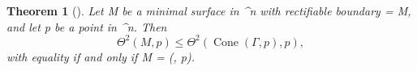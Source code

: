 \documentclass[a4paper, 11pt]{article}
\theoremstyle{plain}
\newtheorem{theorem}{Theorem}[section]
\theoremstyle{definition}
\theoremstyle{remark}
\numberwithin{equation}{subsection}
\def\({}
\def\){}
\def\pi{}
\begin{document}
\begin{theorem}[{\cite[Theorem 1.3]{EWW02}}]
\label{Interior_regularity_basic_estimate}
Let \(M\) be a minimal surface in \(^{n}\) with rectifiable boundary \(\Gamma = \partial M\), and let \(p\) be a point in \(^{n}\). Then
\begin{equation}
\Theta^{2}(M,p) \leqslant \Theta^{2}(\operatorname{Cone}(\Gamma, p), p),
\end{equation}
with equality if and only if \(M = (\Gamma, p)\).
\end{theorem}

\begin{comment}
\begin{proof}
Since \(\Gamma\) is rectifiable, we can assume that \(\operatorname{Length}(\Pi_{p}(\Gamma)) < \infty\) or, equivalently, that \(\Theta^{2}(\operatorname{Cone}(\Gamma, p), p) < \infty\). 

We first consider the case \(p \notin \Gamma\). In the notation above, we can deduce that
\begin{equation}
\Theta^{2}(M', p, r) \leqslant \Theta^{2}(M', p, R)
\end{equation}
for \(0 < r < R < \infty\). For \(R \leqslant \operatorname{dist}(p, \Gamma)\), this is the standard monotonicity formula. For general \(R\), this follows from the extended monotonicity theorem \ref{Extended Monotonicity}. Now letting \(r \rightarrow 0\) and \(R \rightarrow \infty\) gives the required inequality.

If \(p \in \Gamma\), the extended monotonicity theorem remains true, and the proof can be repeated exactly as above, except it is not as obvious now that
\begin{equation}
\lim_{r \rightarrow 0} \Theta^{2}(M', p, r) = \Theta^{2}(M, p).
\end{equation}
To see why this is true, recall that \(M' = M \cup E\), and so
\begin{equation}
\Theta^{2}(M', p, r) = \Theta^{2}(M, p, r) + \Theta^{2}(E, p, r),
\end{equation}
and thus it suffices to show that \(\Theta^{2}(E, p, r) \rightarrow 0\) as \(r \rightarrow 0\).

We can safely assume that \(r \leqslant 1\), in which case
\begin{equation}
E \cap B(p, r) \subset \operatorname{Cone}(\Pi_{p}(\Gamma \cap B(p, r)), p),
\end{equation}
from which we have that
\begin{equation}
\Theta^{2}(E, p, r) \leqslant \frac{1}{2\pi}\operatorname{Length}(\Pi_{p}(\Gamma \cap B(p, r))).
\end{equation}
Since \(\Pi_{p}\Gamma\) has finite length, the mapping \(A \mapsto \operatorname{Length}(\Pi_{p}\Gamma \vert_{A})\) defines a finite Borel measure on \(G\), where \(G\) is a parameter domain for \(\Gamma \setminus \{p\}\). As \(r \rightarrow 0\), \(\Gamma^{-1}(\mathbb{R}^{n} \setminus B(p,r))\) exhausts \(G\), and thus \(\operatorname{Length}(\Pi_{p}(\Gamma \cap B(p, r)))\) tends to \(0\). Therefore we get \(\Theta^{2}(E, p, r) \rightarrow 0\), as required.
\end{proof}
\end{comment}
\end{document}
